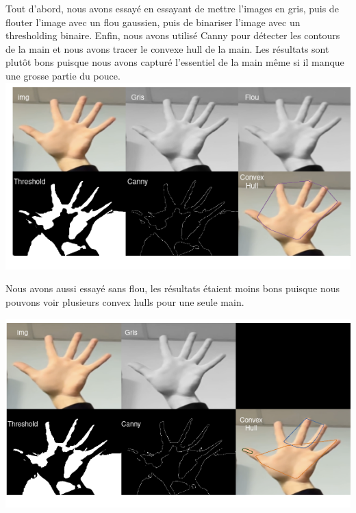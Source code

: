 \documentclass[11pt]{article}
\begin{document}
\bigbreak

Tout d'abord, nous avons essayé en essayant de mettre l'images en gris, puis de flouter l'image avec un flou gaussien, puis de binariser l'image avec un thresholding binaire. Enfin, nous avons utilisé Canny pour détecter les contours de la main et nous avons tracer le convexe hull de la main. Les résultats sont plutôt bons puisque nous avons capturé l'essentiel de la main même si il manque une grosse partie du pouce.\bigbreak
\includegraphics[width=\textwidth]{images/pre_ttt_1.png}
\bigbreak

\bigbreak

Nous avons aussi essayé sans flou, les résultats étaient moins bons puisque nous pouvons voir plusieurs convex hulls pour une seule main. 
\bigbreak

\includegraphics[width=\textwidth]{images/pre_ttt_2.png}
\end{document}
